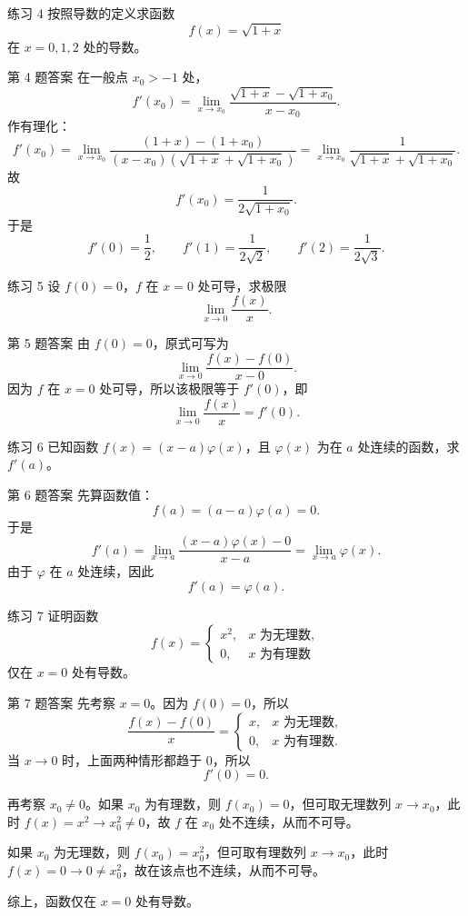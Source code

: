 ﻿\documentclass[aspectratio=169,11pt]{ctexbeamer}
\begin{document}
\begin{frame}{练习 4}
\footnotesize
按照导数的定义求函数
\[
f(x)=\sqrt{1+x}
\]
在 $x=0,1,2$ 处的导数。
\end{frame}

\begin{frame}{第 4 题答案}
\footnotesize
在一般点 $x_0>-1$ 处，
\[
f'(x_0)=\lim_{x\to x_0}\frac{\sqrt{1+x}-\sqrt{1+x_0}}{x-x_0}.
\]
作有理化：
\[
f'(x_0)=\lim_{x\to x_0}\frac{(1+x)-(1+x_0)}{(x-x_0)(\sqrt{1+x}+\sqrt{1+x_0})}
=\lim_{x\to x_0}\frac{1}{\sqrt{1+x}+\sqrt{1+x_0}}.
\]
故
\[
f'(x_0)=\frac{1}{2\sqrt{1+x_0}}.
\]
于是
\[
f'(0)=\frac12,\qquad f'(1)=\frac{1}{2\sqrt2},\qquad f'(2)=\frac{1}{2\sqrt3}.
\]
\end{frame}

\begin{frame}{练习 5}
\footnotesize
设 $f(0)=0$，$f$ 在 $x=0$ 处可导，求极限
\[
\lim_{x\to0}\frac{f(x)}{x}.
\]
\end{frame}

\begin{frame}{第 5 题答案}
\footnotesize
由 $f(0)=0$，原式可写为
\[
\lim_{x\to0}\frac{f(x)-f(0)}{x-0}.
\]
因为 $f$ 在 $x=0$ 处可导，所以该极限等于 $f'(0)$，即
\[
\lim_{x\to0}\frac{f(x)}{x}=f'(0).
\]
\end{frame}

\begin{frame}{练习 6}
\footnotesize
已知函数 $f(x)=(x-a)\varphi(x)$，且 $\varphi(x)$ 为在 $a$ 处连续的函数，求 $f'(a)$。
\end{frame}

\begin{frame}{第 6 题答案}
\footnotesize
先算函数值：
\[
f(a)=(a-a)\varphi(a)=0.
\]
于是
\[
f'(a)=\lim_{x\to a}\frac{(x-a)\varphi(x)-0}{x-a}=\lim_{x\to a}\varphi(x).
\]
由于 $\varphi$ 在 $a$ 处连续，因此
\[
f'(a)=\varphi(a).
\]
\end{frame}

\begin{frame}{练习 7}
\footnotesize
证明函数
\[
f(x)=\begin{cases}
x^2,&x\text{ 为无理数},\\
0,&x\text{ 为有理数}
\end{cases}
\]
仅在 $x=0$ 处有导数。
\end{frame}

\begin{frame}{第 7 题答案}
\footnotesize
先考察 $x=0$。因为 $f(0)=0$，所以
\[
\frac{f(x)-f(0)}{x}=\begin{cases}
x,&x\text{ 为无理数},\\
0,&x\text{ 为有理数}.
\end{cases}
\]
当 $x\to0$ 时，上面两种情形都趋于 $0$，所以
\[
f'(0)=0.
\]

再考察 $x_0\neq0$。如果 $x_0$ 为有理数，则 $f(x_0)=0$，但可取无理数列 $x\to x_0$，此时 $f(x)=x^2\to x_0^2\neq0$，故 $f$ 在 $x_0$ 处不连续，从而不可导。

如果 $x_0$ 为无理数，则 $f(x_0)=x_0^2$，但可取有理数列 $x\to x_0$，此时 $f(x)=0\to0\neq x_0^2$，故在该点也不连续，从而不可导。

综上，函数仅在 $x=0$ 处有导数。
\end{frame}
\end{document}
